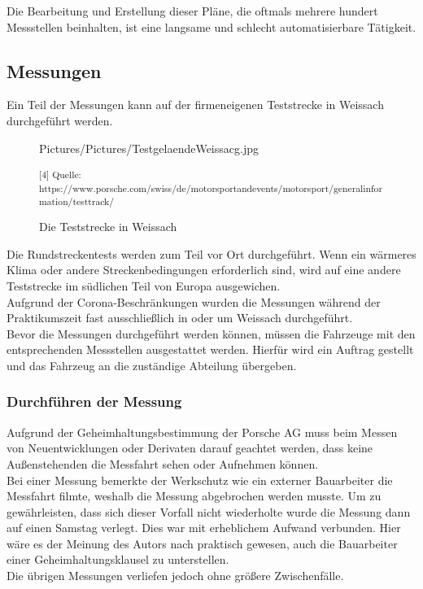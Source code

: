 Die Bearbeitung und Erstellung dieser Pläne, die oftmals mehrere hundert Messstellen beinhalten, ist eine langsame und schlecht automatisierbare Tätigkeit. 

\subsection{Messungen}

Ein Teil der Messungen kann auf der firmeneigenen Teststrecke in Weissach durchgeführt werden.

\begin{figure}[H]
	\begin{center}
		\begin{overpic}[width=\linewidth]{Pictures/Pictures/TestgelaendeWeissacg.jpg}
			
		\end{overpic}
	
	\caption{Die Teststrecke in Weissach}
	
	\small\textsuperscript{[4] Quelle: https://www.porsche.com/swiss/de/motorsportandevents/motorsport/generalinformation/testtrack/}
	\label{testweissach}
	\end{center}
\end{figure}

Die Rundstreckentests werden zum Teil vor Ort durchgeführt. Wenn ein wärmeres Klima oder andere Streckenbedingungen erforderlich sind, wird auf eine andere Teststrecke im südlichen Teil von Europa ausgewichen.\\
Aufgrund der Corona-Beschränkungen wurden die Messungen während der Praktikumszeit fast ausschließlich in oder um Weissach durchgeführt. \\

Bevor die Messungen durchgeführt werden können, müssen die Fahrzeuge mit den entsprechenden Messstellen ausgestattet werden. Hierfür wird ein Auftrag gestellt und das Fahrzeug an die zuständige Abteilung übergeben. \\

\subsubsection{Durchführen der Messung}

Aufgrund der Geheimhaltungsbestimmung der Porsche AG muss beim Messen von Neuentwicklungen oder Derivaten darauf geachtet werden, dass keine Außenstehenden die Messfahrt sehen oder Aufnehmen können. \\
Bei einer Messung bemerkte der Werkschutz wie ein externer Bauarbeiter die Messfahrt filmte, weshalb die Messung abgebrochen werden musste. Um zu gewährleisten, dass sich dieser Vorfall nicht wiederholte wurde die Messung dann auf einen Samstag verlegt. Dies war mit erheblichem Aufwand verbunden. Hier wäre es der Meinung des Autors nach praktisch gewesen, auch die Bauarbeiter einer Geheimhaltungsklausel zu unterstellen.\\
Die übrigen Messungen verliefen jedoch ohne größere Zwischenfälle. \\

